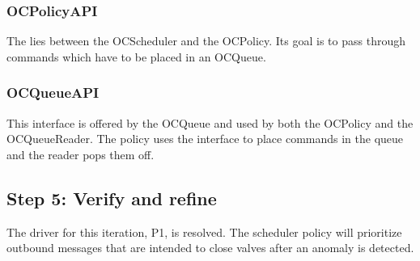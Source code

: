 \subsubsection{OCPolicyAPI}

\npar The  lies between the OCScheduler and the OCPolicy.
Its goal is to pass through commands which have to be placed in an OCQueue.

\subsubsection{OCQueueAPI}

\npar This interface is offered by the OCQueue and used by both the OCPolicy and
the OCQueueReader. The policy uses the interface to place commands in the queue
and the reader pops them off.

\subsection{Step 5: Verify and refine}
\label{add:it7/verification}

\npar The driver for this iteration, P1, is resolved. The scheduler policy will
prioritize outbound messages that are intended to close valves after an anomaly
is detected.
